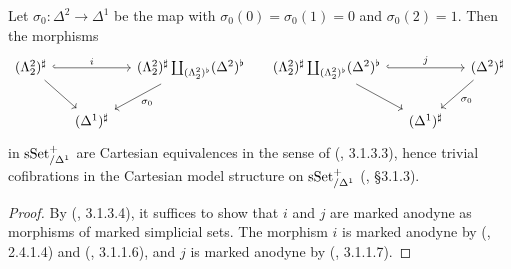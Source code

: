 \documentclass{tac}
\newcommand{\tx}[1]{\textnormal{#1}}
\begin{document}
\begin{lemma}\label{righthorninneran} Let $\sigma_0 : \Delta^2 \to \Delta^1$ be the map with $\sigma_0 (0)=\sigma_0 (1) = 0$ and $\sigma_0 (2)=1$.  Then the morphisms
\[\begin{tikzcd}[column sep=small]
( \Lambda^2_2 )^\sharp \arrow[hook]{rr}{i} \arrow[]{dr}& & ( \Lambda^2_2 )^\sharp \coprod_{( \Lambda^2_2 )^\flat} (\Delta^2)^\flat \arrow[]{dl}{\sigma_0} &    ( \Lambda^2_2 )^\sharp \coprod_{( \Lambda^2_2 )^\flat} (\Delta^2)^\flat \arrow[hook]{rr}{j}  \arrow[]{dr} & & (\Delta^2)^\sharp  \arrow[]{dl}{\sigma_0}  \\
  & (\Delta^1)^\sharp & &  &  (\Delta^1)^\sharp &
\end{tikzcd}\]
in $\tx{sSet}^+_{/\Delta^1}$ are Cartesian equivalences in the sense of (\cite{htt}, 3.1.3.3), hence trivial cofibrations in the Cartesian model structure on $\tx{sSet}^+_{/\Delta^1}$ (\cite{htt}, \S 3.1.3).
\end{lemma}
\begin{proof}  By (\cite{htt}, 3.1.3.4), it suffices to show that $i$ and $j$ are marked anodyne as morphisms of marked simplicial sets.  The morphism $i$ is marked anodyne by (\cite{htt}, 2.4.1.4) and (\cite{htt}, 3.1.1.6), and $j$ is marked anodyne by (\cite{htt}, 3.1.1.7).
\end{proof}
\end{document}
